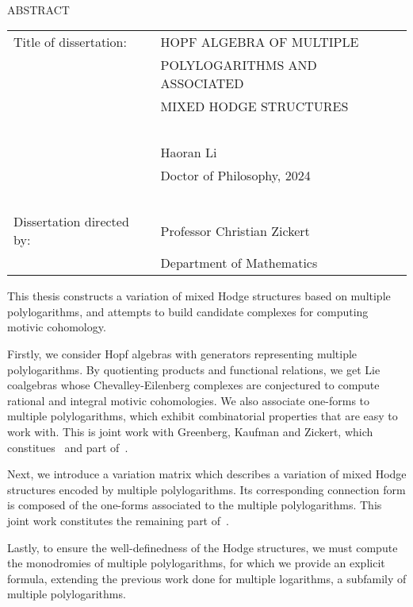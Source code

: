 
\hbox{\ }

\renewcommand{\baselinestretch}{1}
\small \normalsize

\begin{center}
\large{{ABSTRACT}}

\vspace{3em}

\end{center}
\hspace{-.15in}
\begin{tabular}{ll}
Title of dissertation:
&{\large HOPF ALGEBRA OF MULTIPLE}\\
&{\large POLYLOGARITHMS AND ASSOCIATED}\\
&{\large MIXED HODGE STRUCTURES}\\
\ \\
&{\large Haoran Li}\\
&{\large Doctor of Philosophy, 2024} \\
\ \\
Dissertation directed by:
&{\large Professor Christian Zickert} \\
&{\large Department of Mathematics} \\
\end{tabular}

\vspace{3em}

\renewcommand{\baselinestretch}{2}
\large \normalsize

This thesis constructs a variation of mixed Hodge structures based on multiple polylogarithms, and attempts to build candidate complexes for computing motivic cohomology.

Firstly, we consider Hopf algebras with generators representing multiple polylogarithms. By quotienting products and functional relations, we get Lie coalgebras whose Chevalley-Eilenberg complexes are conjectured to compute rational and integral motivic cohomologies. We also associate one-forms to multiple polylogarithms, which exhibit combinatorial properties that are easy to work with. This is joint work with Greenberg, Kaufman and Zickert, which constitues~\cite{ZDHZ_TheLieCoalgebraOfMultiplePolylogarithms} and part of~\cite{ZDHZ_HopfAlgebrasOfMultiplePolylogarithmsAndHolomorphicOneForms}.

Next, we introduce a variation matrix which describes a variation of mixed Hodge structures encoded by multiple polylogarithms. Its corresponding connection form is composed of the one-forms associated to the multiple polylogarithms. This joint work constitutes the remaining part of~\cite{ZDHZ_HopfAlgebrasOfMultiplePolylogarithmsAndHolomorphicOneForms}.

Lastly, to ensure the well-definedness of the Hodge structures, we must compute the monodromies of multiple polylogarithms, for which we provide an explicit formula, extending the previous work done for multiple logarithms, a subfamily of multiple polylogarithms.